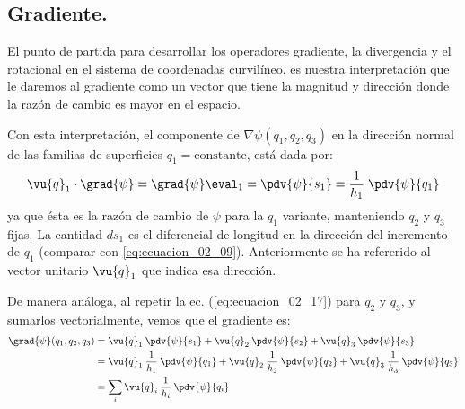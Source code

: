 \subsection{Gradiente.} 
El punto de partida para desarrollar los operadores gradiente, la divergencia y el rotacional en el sistema de coordenadas curvilíneo, es nuestra interpretación que le daremos al gradiente como un vector que tiene la magnitud y dirección donde la razón de cambio es mayor en el espacio.
\par
Con esta interpretación, el componente de $\nabla \psi(q_{1}, q_{2}, q_{3})$ en la dirección normal de las familias de superficies $q_{1} = \text{constante}$, está dada por:
\begin{equation}
\vu{q}_{1} \cdot \grad{\psi} = \grad{\psi} \eval_{1} = \pdv{\psi}{s_{1}} = \dfrac{1}{h_{1}} \; \pdv{\psi}{q_{1}}
\label{eq:ecuacion_02_17}
\end{equation}
ya que ésta es la razón de cambio de $\psi$ para la $q_{1}$ variante, manteniendo $q_{2}$ y $q_{3}$ fijas. La cantidad $ds_{1}$ es el diferencial de longitud en la dirección del incremento de $q_{1}$ (comparar con \ref{eq:ecuacion_02_09}). Anteriormente se ha refererido al vector unitario $\vu{q}_{1}$ que indica esa dirección.
\par
De manera análoga, al repetir la ec. (\ref{eq:ecuacion_02_17}) para $q_{2}$ y $q_{3}$, y sumarlos vectorialmente, vemos que el gradiente es:
\begin{align}
\begin{aligned}
\grad{\psi} (q_{1},q_{2},q_{3}) &= \vu{q}_{1} \: \pdv{\psi}{s_{1}} + \vu{q}_{2} \: \pdv{\psi}{s_{2}} + \vu{q}_{3} \: \pdv{\psi}{s_{3}} \\
&= \vu{q}_{1} \: \dfrac{1}{h_{1}} \: \pdv{\psi}{q_{1}} + \vu{q}_{2}\: \dfrac{1}{h_{2}} \: \pdv{\psi}{q_{2}} + \vu{q}_{3} \: \dfrac{1}{h_{3}} \: \pdv{\psi}{q_{3}} \\
&= \sum_{i} \vu{q}_{i} \: \dfrac{1}{h_{i}} \: \pdv{\psi}{q_{i}}
\label{eq:ecuacion_02_18}
\end{aligned}
\end{align}
